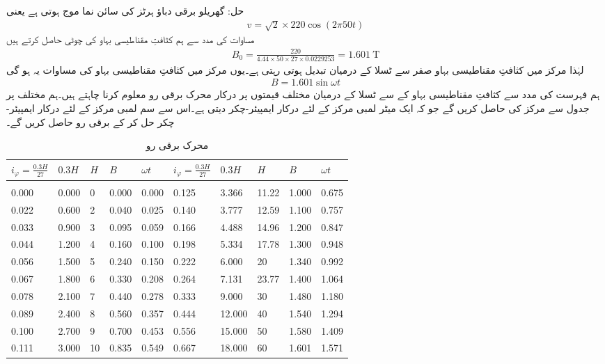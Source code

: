 حل:
	گھریلو برقی دباؤ  ہرٹز کی سائن نما موج ہوتی ہے یعنی
\begin{align}
v=\sqrt{2} \times 220 \cos (2 \pi  50 t)
\end{align}
مساوات   کی مدد سے ہم کثافتِ مقناطیسی بہاو کی چوٹی حاصل کرتے ہیں
\begin{align}
B_0=\frac{220}{4.44 \times 50 \times 27 \times 0.0229253}=\SI{1.601}{\tesla}
\end{align}
لہٰذا مرکز میں کثافتِ مقناطیسی بہاو صفر سے   ٹسلا کے درمیان تبدیل ہوتی رہتی ہے۔یوں مرکز میں کثافتِ مقناطیسی بہاو کی مساوات یہ ہو گی
\begin{align}\label{مساوات_مقناطیسی_دور_سائن_نما_کثافت_بہاو}
B=1.601 \sin \omega t
\end{align}
ہم فہرست کی مدد سے کثافتِ مقناطیسی بہاو کے   سے  ٹسلا کے درمیان مختلف قیمتوں پر درکار محرک برقی رو  معلوم کرنا چاہتے ہیں۔ہم مختلف  پر جدول  سے مرکز کی  حاصل کریں گے جو کہ ایک میٹر لمبی مرکز کے لئے درکار ایمپیئر-چکر دیتی ہے۔اس سے  سم لمبی مرکز کے لئے درکار ایمپیئر-چکر  حل کر کے برقی رو حاصل کریں گے۔

%
\begin{table}
\begin{tabular}{l l l l l | l l l l l}
$i_{\varphi}=\frac{0.3 H}{27}$&$0.3H$&$H$&$B$&$\omega t$&$i_{\varphi}=\frac{0.3 H}{27}$&$0.3H$&$H$&$B$&$\omega t$\\
\hline\\
0.000&0.000&0&0.000&0.000&0.125&3.366&11.22&1.000&0.675\\
0.022&0.600&2&0.040&0.025&0.140&3.777&12.59&1.100&0.757\\
0.033&0.900&3&0.095&0.059&0.166&4.488&14.96&1.200&0.847\\
0.044&1.200&4&0.160&0.100&0.198&5.334&17.78&1.300&0.948\\
0.056&1.500&5&0.240&0.150&0.222&6.000&20&1.340&0.992\\
0.067&1.800&6&0.330&0.208&0.264&7.131&23.77&1.400&1.064\\
0.078&2.100&7&0.440&0.278&0.333&9.000&30&1.480&1.180\\
0.089&2.400&8&0.560&0.357&0.444&12.000&40&1.540&1.294\\
0.100&2.700&9&0.700&0.453&0.556&15.000&50&1.580&1.409\\
0.111&3.000&10&0.835&0.549&0.667&18.000&60&1.601&1.571\\
\hline
\end{tabular}
\caption{محرک برقی رو}
\label{جدول_مقناطیسی_ادوار_محرک_برقی_رو_بالمقابل_کثافت_بہاو}
\end{table}

